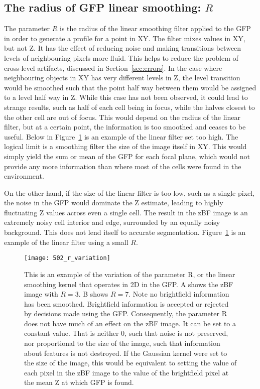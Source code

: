 \subsection{The radius of GFP linear smoothing: $R$}

The parameter $R$ is the radius of the linear smoothing filter applied to the GFP in order to generate a profile for a point in XY. The filter mixes values in XY, but not Z. It has the effect of reducing noise and making transitions between levels of neighbouring pixels more fluid. This helps to reduce the problem of cross-level artifacts, discussed in Section~\ref{sec:errors}. In the case where neighbouring objects in XY has very different levels in Z, the level transition would be smoothed such that the point half way between them would be assigned to a level half way in Z. While this case has not been observed, it could lead to strange results, such as half of each cell being in focus, while the halves closest to the other cell are out of focus. This would depend on the radius of the linear filter, but at a certain point, the information is too smoothed and ceases to be useful. Below in Figure~\ref{fig:rvariation} is an example of the linear filter set too high. The logical limit is a smoothing filter the size of the image itself in XY. This would simply yield the sum or mean of the GFP for each focal plane, which would not provide any more information than where most of the cells were found in the environment.

On the other hand, if the size of the linear filter is too low, such as a single pixel, the noise in the GFP would dominate the Z estimate, leading to highly fluctuating Z values across even a single cell. The result in the zBF image is an extremely noisy cell interior and edge, surrounded by an equally noisy background. This does not lend itself to accurate segmentation. Figure~\ref{fig:rvariation} is an example of the linear filter using a small $R$.

\begin{figure}[h!]
 \centering
 \texttt{[image: 502\_r\_variation]}
 \caption[Varying R]{
 	This is an example of the variation of the parameter R, or the linear smoothing kernel that operates in 2D in the GFP. A shows the zBF image with $R=3$. B shows $R=7$. Note no brightfield information has been smoothed. Brightfield information is accepted or rejected by decisions made using the GFP. Consequently, the parameter R does not have much of an effect on the zBF image. It can be set to a constant value. That is neither 0, such that noise is not preserved, nor proportional to the size of the image, such that information about features is not destroyed. If the Gaussian kernel were set to the size of the image, this would be equivalent to setting the value of each pixel in the zBF image to the value of the brightfield pixel at the mean Z at which GFP is found.
 }
 \label{fig:rvariation}
\end{figure}

